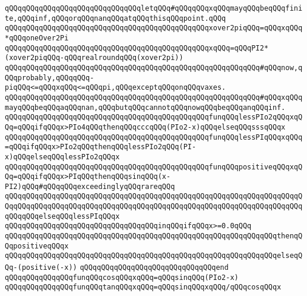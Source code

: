 \verb|qQQqqQQqqQQqqQQqqQQqqQQqqQQqqQQqletqQQq#qQQqqQQqxqQQqmayqQQqbeqQQqfinite,qQQqinf,qQQqorqQQqnanqQQqatqQQqthisqQQqpoint.qQQq|\newline
\verb|qQQqqQQqqQQqqQQqqQQqqQQqqQQqqQQqqQQqqQQqqQQqqQQqxover2piqQQq=qQQqxqQQq*qQQqoneOver2Pi|\newline
\verb|qQQqqQQqqQQqqQQqqQQqqQQqqQQqqQQqqQQqqQQqqQQqqQQqxqQQq=qQQqPI2*(xover2piqQQq-qQQqrealroundqQQq(xover2pi))|\newline
\newline
\verb|qQQqqQQqqQQqqQQqqQQqqQQqqQQqqQQqqQQqqQQqqQQqqQQqqQQqqQQqqQQq#qQQqnow,qQQqprobably,qQQqqQQq-piqQQq<=qQQqxqQQq<=qQQqpi,qQQqexceptqQQqonqQQqvaxes.|\newline
\verb|qQQqqQQqqQQqqQQqqQQqqQQqqQQqqQQqqQQqqQQqqQQqqQQqqQQqqQQqqQQq#qQQqxqQQqmayqQQqbeqQQqaqQQqnan,qQQqbutqQQqcannotqQQqnowqQQqbeqQQqanqQQqinf.|\newline
\newline
\verb|qQQqqQQqqQQqqQQqqQQqqQQqqQQqqQQqqQQqqQQqqQQqqQQqfunqQQqlessPIo2qQQqxqQQq=qQQqifqQQqx>PIo4qQQqthenqQQqcccqQQq(PIo2-x)qQQqelseqQQqsssqQQqx|\newline
\verb|qQQqqQQqqQQqqQQqqQQqqQQqqQQqqQQqqQQqqQQqqQQqqQQqfunqQQqlessPIqQQqxqQQq=qQQqifqQQqx>PIo2qQQqthenqQQqlessPIo2qQQq(PI-x)qQQqelseqQQqlessPIo2qQQqx|\newline
\verb|qQQqqQQqqQQqqQQqqQQqqQQqqQQqqQQqqQQqqQQqqQQqqQQqfunqQQqpositiveqQQqxqQQq=qQQqifqQQqx>PIqQQqthenqQQqsinqQQq(x-PI2)qQQq#qQQqqQQqexceedinglyqQQqrareqQQq|\newline
\verb|qQQqqQQqqQQqqQQqqQQqqQQqqQQqqQQqqQQqqQQqqQQqqQQqqQQqqQQqqQQqqQQqqQQqqQQqqQQqqQQqqQQqqQQqqQQqqQQqqQQqqQQqqQQqqQQqqQQqqQQqqQQqqQQqqQQqqQQqqQQqqQQqqQQqelseqQQqlessPIqQQqx|\newline
\verb|qQQqqQQqqQQqqQQqqQQqqQQqqQQqqQQqqQQqinqQQqifqQQqx>=0.0qQQq|\newline
\verb|qQQqqQQqqQQqqQQqqQQqqQQqqQQqqQQqqQQqqQQqqQQqqQQqqQQqqQQqqQQqqQQqthenqQQqpositiveqQQqx|\newline
\verb|qQQqqQQqqQQqqQQqqQQqqQQqqQQqqQQqqQQqqQQqqQQqqQQqqQQqqQQqqQQqqQQqelseqQQq-(positive(-x))|\newline
\verb|qQQqqQQqqQQqqQQqqQQqqQQqqQQqqQQqend|\newline
\newline
\verb|qQQqqQQqqQQqqQQqfunqQQqcosqQQqxqQQq=qQQqsinqQQq(PIo2-x)|\newline
\newline
\verb|qQQqqQQqqQQqqQQqfunqQQqtanqQQqxqQQq=qQQqsinqQQqxqQQq/qQQqcosqQQqx|\newline
